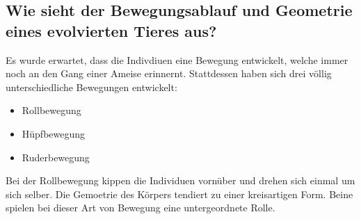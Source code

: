     \subsection{Wie sieht der Bewegungsablauf und Geometrie eines evolvierten Tieres aus?}

      Es wurde erwartet, dass die Indivdiuen eine Bewegung entwickelt, welche immer noch an den Gang einer Ameise erinnernt.
      Stattdessen haben sich drei völlig unterschiedliche Bewegungen entwickelt:

      \begin{itemize}
        \item Rollbewegung
        \item Hüpfbewegung
        \item Ruderbewegung
      \end{itemize}

      Bei der Rollbewegung kippen die Individuen vornüber und drehen sich einmal um sich selber.
      Die Gemoetrie des Körpers tendiert zu einer kreisartigen Form.
      Beine spielen bei dieser Art von Bewegung eine untergeordnete Rolle.

